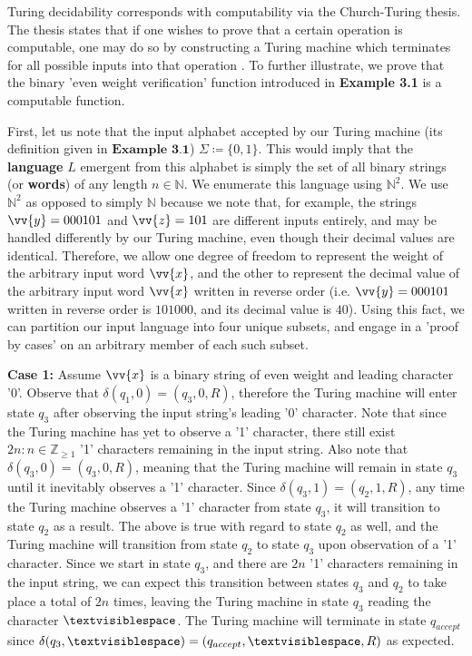 \documentclass{article}
\begin{document}
\noindent Turing decidability corresponds with computability via the Church-Turing thesis.  The thesis states that if one wishes to prove that a certain operation is computable, one may do so by constructing a Turing machine which terminates for all possible inputs into that operation \cite{6}. To further illustrate, we prove that the binary 'even weight verification' function introduced in \textbf{Example 3.1} is a computable function.
\begin{prf}
	First, let us note that the input alphabet accepted by our Turing machine (its definition given in $\textbf{Example 3.1}$) $\Sigma \coloneq \{ 0, 1 \}$.  This would imply that the \textbf{language} $L$ emergent from this alphabet is simply the set of all binary strings (or \textbf{words}) of any length $n \in \mathbb{N}$.  We enumerate this language using $\mathbb{N}^{2}$.  We use $\mathbb{N}^{2}$ as opposed to simply $\mathbb{N}$ because we note that, for example, the strings $\vv{y}=000101$ and $\vv{z}=101$ are different inputs entirely, and may be handled differently by our Turing machine, even though their decimal values are identical.  Therefore, we allow one degree of freedom to represent the weight of the arbitrary input word $\vv{x}$, and the other to represent the decimal value of the arbitrary input word $\vv{x}$ written in reverse order (i.e. $\vv{y}=000101$ written in reverse order is $101000$, and its decimal value is $40$).  Using this fact, we can partition our input language into four unique subsets, and engage in a 'proof by cases' on an arbitrary member of each such subset.\\
\begin{adjustwidth}{0.5cm}{}
	\textbf{Case 1:} Assume $\vv{x}$ is a binary string of even weight and leading character '0'.  Observe that $\delta(q_{1}, 0) = (q_{3}, 0, R)$, therefore the Turing machine will enter state $q_{3}$ after observing the input string's leading '0' character.  Note that since the Turing machine has yet to observe a '1' character, there still exist $2n : n \in \mathbb{Z}_{\geq 1}$ '1' characters remaining in the input string.  Also note that $\delta(q_{3}, 0) = (q_{3}, 0, R)$, meaning that the Turing machine will remain in state $q_{3}$ until it inevitably observes a '1' character.  Since $\delta(q_{3}, 1) = (q_{2}, 1, R)$, any time the Turing machine observes a '1' character from state $q_{3}$, it will transition to state $q_{2}$ as a result.  The above is true with regard to state $q_{2}$ as well, and the Turing machine will transition from state $q_{2}$ to state $q_{3}$ upon observation of a '1' character.  Since we start in state $q_{3}$, and there are $2n$ '1' characters remaining in the input string, we can expect this transition between states $q_{3}$ and $q_{2}$ to take place a total of $2n$ times, leaving the Turing machine in state $q_{3}$ reading the character $\textvisiblespace$.  The Turing machine will terminate in state $q_{accept}$ since $\delta(q_{3}, \textvisiblespace) = (q_{accept}, \textvisiblespace, R)$ as expected.\\

\end{adjustwidth}
\end{prf}
\end{document}
